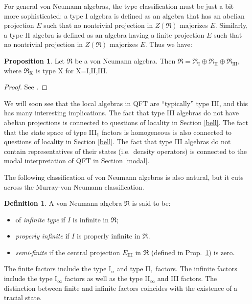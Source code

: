\documentclass[11pt]{article}
\newcommand{\alg}[1]{\mathfrak{#1}}
\theoremstyle{definition}
\newtheorem{prop}[thm]{Proposition}
\theoremstyle{definition}
\newtheorem{defn}[thm]{Definition}
\theoremstyle{remark}
\begin{document}
For general von Neumann algebras, the type classification must be just
a bit more sophisticated: a type I algebra is defined as an algebra
that has an abelian projection $E$ such that no nontrivial projection
in $Z(\alg{R})$ majorizes $E$.  Similarly, a type II algebra is
defined as an algebra having a finite projection $E$ such that no
nontrivial projection in $Z(\alg{R})$ majorizes $E$.  Thus we have:

\begin{prop} Let $\alg{R}$ be a von Neumann algebra.  Then
  $\alg{R}=\alg{R}_{\mathrm{I}}\oplus \alg{R}_{\mathrm{II}}\oplus
  \alg{R}_{\mathrm{III}}$, where $\alg{R}_{\mathrm{X}}$ is type X for X=I,II,III.
  \label{threeway}
\end{prop}

\begin{proof} See \cite[Thm.\ 6.5.2]{kr}. \end{proof}

We will soon see that the local algebras in QFT are ``typically'' type III, and this
has many interesting implications.  The fact that type III algebras do not have
abelian projections is connected to questions of locality in Section \ref{bell}.  The
fact that the state space of type III$_1$ factors is homogeneous is also connected to
questions of locality in Section \ref{bell}.  The fact that type III algebras do not
contain representatives of their states (i.e.\ density operators) is connected to the
modal interpretation of QFT in Section \ref{modal}.

The following classification of von Neumann algebras is also natural,
but it cuts across the Murray-von Neumann classification.

\begin{defn} A von Neumann algebra $\alg{R}$ is said to be:
\begin{itemize}
\item of \emph{infinite type} if $I$ is infinite in $\alg{R}$;
\item \emph{properly infinite} if $I$ is properly infinite in $\alg{R}$.
\item \emph{semi-finite} if the central projection $E_{\mathrm{III}}$ in $\alg{R}$
  (defined in Prop.\ \ref{threeway}) is zero.
\end{itemize}\end{defn}

The finite factors include the type I$_n$ and type II$_1$ factors.
The infinite factors include the type I$_{\infty}$ factors as well as
the type II$_{\infty}$ and III factors.  The distinction between
finite and infinite factors coincides with the existence of a tracial
state.
\end{document}
